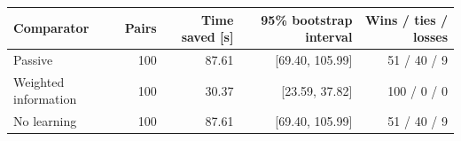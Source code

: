\begin{tabular}{lrrrr}
\toprule
Comparator & Pairs & Time saved [s] & 95\% bootstrap interval & Wins / ties / losses \\
\midrule
Passive & 100 & 87.61 & [69.40, 105.99] & 51 / 40 / 9 \\
Weighted information & 100 & 30.37 & [23.59, 37.82] & 100 / 0 / 0 \\
No learning & 100 & 87.61 & [69.40, 105.99] & 51 / 40 / 9 \\
\bottomrule
\end{tabular}
